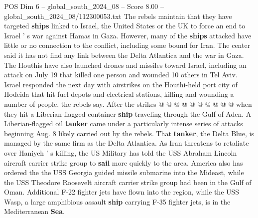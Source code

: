 \begin{textsample}{POS Dim 6 – global\_south\_2024\_08 – Score 8.00 – global\_south\_2024\_08/112300053.txt}
The rebels maintain that they have targeted \textbf{ships} linked to Israel, the United States or the UK to force an end to Israel ' s war against Hamas in Gaza.
However, many of the \textbf{ships} attacked have little or no connection to the conflict, including some bound for Iran.
The center said it has not find any link between the Delta Atlantica and the war in Gaza.
The Houthis have also launched drones and missiles toward Israel, including an attack on July 19 that killed one person and wounded 10 others in Tel Aviv.
Israel responded the next day with airstrikes on the Houthi-held port city of Hodeida that hit fuel depots and electrical stations, killing and wounding a number of people, the rebels say.
After the strikes @ @ @ @ @ @ @ @ @ @ when they hit a Liberian-flagged container \textbf{ship} traveling through the Gulf of Aden.
A Liberian-flagged oil \textbf{tanker} came under a particularly intense series of attacks beginning Aug. 8 likely carried out by the rebels.
That \textbf{tanker}, the Delta Blue, is managed by the same firm as the Delta Atlantica.
As Iran threatens to retaliate over Haniyeh ' s killing, the US Military has told the USS Abraham Lincoln aircraft carrier strike group to \textbf{sail} more quickly to the area.
America also has ordered the the USS Georgia guided missile submarine into the Mideast, while the USS Theodore Roosevelt aircraft carrier strike group had been in the Gulf of Oman.
Additional F-22 fighter jets have flown into the region, while the USS Wasp, a large amphibious assault \textbf{ship} carrying F-35 fighter jets, is in the Mediterranean \textbf{Sea}.

\end{textsample}
